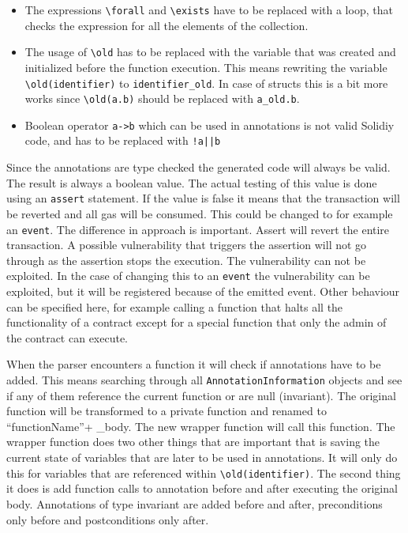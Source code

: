 \documentclass[a4paper]{article}
\begin{document}
\begin{itemize}
  \item The expressions \texttt{\textbackslash forall} and \texttt{\textbackslash exists} have to be replaced with a loop, that checks the expression for all the elements of the collection. 
  \item The usage of \texttt{\textbackslash old} has to be replaced with the variable that was created and initialized before the function execution. This means rewriting the variable \texttt{\textbackslash old(identifier)} to \texttt{identifier\_old}. In case of structs this is a bit more works since \texttt{\textbackslash old(a.b)} should be replaced with \texttt{a\_old.b}.
  \item Boolean operator \texttt{a->b} which can be used in annotations is not valid Solidiy code, and has to be replaced with \texttt{!a||b}
\end{itemize}
Since the annotations are type checked the generated code will always be valid. The result is always a boolean value. The actual testing of this value is done using an \texttt{assert} statement. If the value is false it means that the transaction will be reverted and all gas will be consumed. This could be changed to for example an \texttt{event}. The difference in approach is important. Assert will revert the entire transaction. A possible vulnerability that triggers the assertion will not go through as the assertion stops the execution. The vulnerability can not be exploited. In the case of changing this to an \texttt{event} the vulnerability can be exploited, but it will be registered because of the emitted event. Other behaviour can be specified here, for example calling a function that halts all the functionality of a contract except for a special function that only the admin of the contract can execute.\par
When the parser encounters a function it will check if annotations have to be added. This means searching through all \texttt{AnnotationInformation} objects and see if any of them reference the current function or are null (invariant). The original function will be transformed to a private function and renamed to ``functionName''+ \_body. The new wrapper function will call this function. The wrapper function does two other things that are important that is saving the current state of variables that are later to be used in annotations. It will only do this for variables that are referenced within \texttt{\textbackslash old(identifier)}. The second thing it does is add function calls to annotation before and after executing the original body. Annotations of type invariant are added before and after, preconditions only before and postconditions only after. \par
\end{document}
